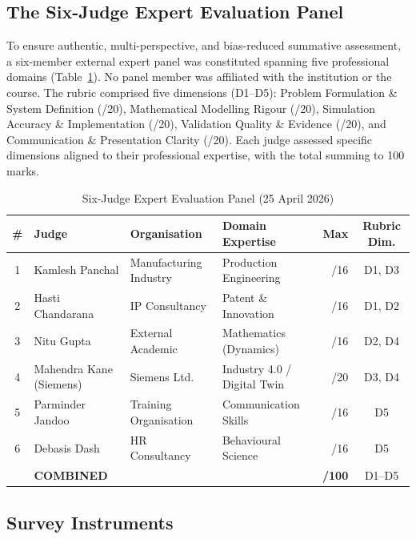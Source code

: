 \documentclass[utf8]{FrontiersinHarvard}
\begin{document}
\subsection{The Six-Judge Expert Evaluation Panel}

To ensure authentic, multi-perspective, and bias-reduced summative
assessment, a six-member external expert panel was constituted spanning
five professional domains (Table~\ref{tab:judges}). No panel member was
affiliated with the institution or the course. The rubric comprised five
dimensions (D1--D5): Problem Formulation \& System Definition (/20),
Mathematical Modelling Rigour (/20), Simulation Accuracy \& Implementation
(/20), Validation Quality \& Evidence (/20), and Communication \&
Presentation Clarity (/20). Each judge assessed specific dimensions aligned
to their professional expertise, with the total summing to 100 marks.

\begin{table}[h]
\caption{Six-Judge Expert Evaluation Panel (25 April 2026)}
\label{tab:judges}
\begin{tabular}{clllrc}
\toprule
\textbf{\#} & \textbf{Judge} & \textbf{Organisation} &
\textbf{Domain Expertise} & \textbf{Max} & \textbf{Rubric Dim.} \\
\midrule
1 & Kamlesh Panchal         & Manufacturing Industry & Production Engineering      & /16 & D1, D3 \\
2 & Hasti Chandarana        & IP Consultancy         & Patent \& Innovation        & /16 & D1, D2 \\
3 & Nitu Gupta              & External Academic      & Mathematics (Dynamics)      & /16 & D2, D4 \\
4 & Mahendra Kane (Siemens) & Siemens Ltd.           & Industry 4.0 / Digital Twin & /20 & D3, D4 \\
5 & Parminder Jandoo        & Training Organisation  & Communication Skills        & /16 & D5     \\
6 & Debasis Dash            & HR Consultancy         & Behavioural Science         & /16 & D5     \\
\midrule
  & \textbf{COMBINED}       &                        &                             & \textbf{/100} & D1--D5 \\
\bottomrule
\end{tabular}
\end{table}

\subsection{Survey Instruments}
\end{document}
